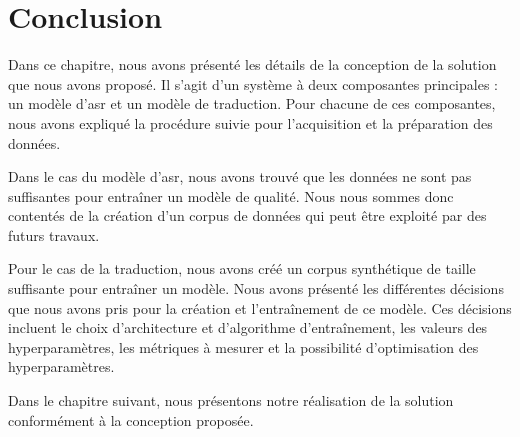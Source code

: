 \section{Conclusion}

Dans ce chapitre, nous avons présenté les détails de la conception de la solution que nous avons proposé.
Il s'agit d'un système à deux composantes principales : 
un modèle d'\gls{asr} et un modèle de traduction.
Pour chacune de ces composantes, nous avons expliqué la procédure suivie 
pour l'acquisition et la préparation des données.

Dans le cas du modèle d'\gls{asr}, nous avons trouvé que les données ne sont pas suffisantes 
pour entraîner un modèle de qualité.
Nous nous sommes donc contentés de la création d'un corpus de données qui peut être exploité par des futurs travaux.

Pour le cas de la traduction, nous avons créé un corpus synthétique de taille suffisante pour entraîner un modèle.
Nous avons présenté les différentes décisions que nous avons pris pour la création et l'entraînement de ce modèle.
Ces décisions incluent le choix d'architecture et d'algorithme d'entraînement, 
les valeurs des hyperparamètres, les métriques à mesurer et la possibilité d'optimisation des hyperparamètres.

Dans le chapitre suivant, nous présentons notre réalisation de la solution conformément à la conception proposée.


